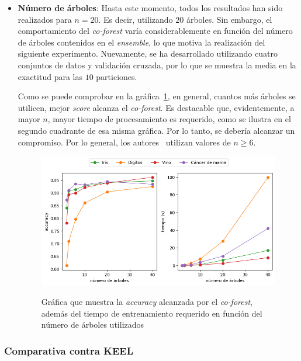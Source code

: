\begin{itemize}
	\item{\textbf{Número de árboles}}: Hasta este momento, todos los resultados han sido realizados para $n=20$. Es decir, utilizando $20$ árboles. Sin embargo, el comportamiento del \textit{co-forest} varía considerablemente en función del número de árboles contenidos en el \textit{ensemble}, lo que motiva la realización del siguiente experimento. Nuevamente, se ha desarrollado utilizando cuatro conjuntos de datos y validación cruzada, por lo que se muestra la media en la exactitud para las $10$ particiones.
	
	Como se puede comprobar en la gráfica~\ref{cf:tt_trees}, en general, cuantos más árboles se utilicen, mejor \textit{score} alcanza el \textit{co-forest}. Es destacable que, evidentemente, a mayor $n$, mayor tiempo de procesamiento es requerido, como se ilustra en el segundo cuadrante de esa misma gráfica. Por lo tanto, se debería alcanzar un compromiso. Por lo general, los autores~\cite{originalCoForest2007} utilizan valores de $n \geq 6$.
	
	\begin{figure}[h]
		\caption[\textit{Co-Forest}: resultados (número de árboles)]{Gráfica que muestra la \textit{accuracy} alcanzada por el \textit{co-forest}, además del tiempo de entrenamiento requerido en función del número de árboles utilizados}
		\centering
		\includegraphics[scale=0.7]{../img/memoria/5_coforest_trees}
		\label{cf:tt_trees}
	\end{figure}
	
\end{itemize} 


\subsubsection{Comparativa contra KEEL}

